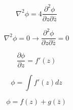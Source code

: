 \documentclass[12pt]{article}
\begin{document}
\[
    \nabla^2 \phi = 4 \frac{\partial^2 \phi}{\partial z \partial \bar{z}}
\]

\[
    \nabla^2 \phi = 0 \rightarrow \frac{\partial^2 \phi}{\partial z \partial \bar{z}} = 0
\]

\[
    \frac{\partial\phi}{\partial z} = f'(z)
\]

\[
    \phi = \int f'(z) dz
\]

\[
    \phi = f(z) + g(\bar{z})
\]

\newpage



\nocite{arfken2013mathematical}
\nocite{El-Deeb_PEU-455_Assignments}
\end{document}
